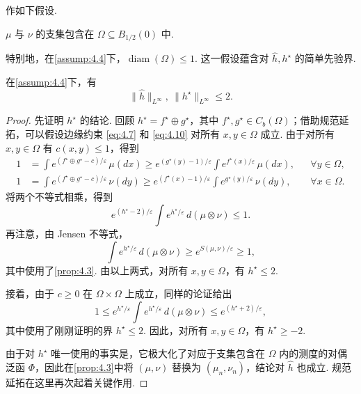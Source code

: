 作如下假设.
\begin{assumption}\label{assump:4.4}
$\mu$ 与 $\nu$ 的支集包含在 $\Omega\subseteq B_{1/2}(0)$ 中.
\end{assumption}
特别地，在\autoref{assump:4.4}下，$\operatorname{diam}(\Omega)\le1$. 这一假设蕴含对 $\widehat h,h^\star$ 的简单先验界.
\begin{proposition}\label{prop:4.5}
在\autoref{assump:4.4}下，有
$$\|\widehat h\|_{L^\infty},\ \|h^\star\|_{L^\infty}\le2.$$
\end{proposition}
\begin{proof}
先证明 $h^\star$ 的结论. 回顾 $h^\star=f^\star\oplus g^\star$，其中 $f^\star,g^\star\in C_b(\Omega)$；借助规范延拓，可以假设边缘约束 \eqref{eq:4.7} 和 \eqref{eq:4.10} 对所有 $x,y\in\Omega$ 成立. 由于对所有 $x,y\in\Omega$ 有 $c(x,y)\le1$，得到
$$\begin{aligned}
1&=\int e^{(f^\star\oplus g^\star-c)/\varepsilon}\,\mu(dx)
\ge e^{(g^\star(y)-1)/\varepsilon}\int e^{f^\star(x)/\varepsilon}\,\mu(dx),&&\forall y\in\Omega,\\
1&=\int e^{(f^\star\oplus g^\star-c)/\varepsilon}\,\nu(dy)
\ge e^{(f^\star(x)-1)/\varepsilon}\int e^{g^\star(y)/\varepsilon}\,\nu(dy),&&\forall x\in\Omega.
\end{aligned}$$
将两个不等式相乘，得到
$$e^{(h^\star-2)/\varepsilon}\int e^{h^\star/\varepsilon}\,d(\mu\otimes\nu)\le1.$$
再注意，由 Jensen 不等式，
$$\int e^{h^\star/\varepsilon}\,d(\mu\otimes\nu)\ge e^{S(\mu,\nu)/\varepsilon}\ge1,$$
其中使用了\autoref{prop:4.3}. 由以上两式，对所有 $x,y\in\Omega$，有 $h^\star\le2$.

接着，由于 $c\ge0$ 在 $\Omega\times\Omega$ 上成立，同样的论证给出
$$1\le e^{h^\star/\varepsilon}\int e^{h^\star/\varepsilon}\,d(\mu\otimes\nu)
\le e^{(h^\star+2)/\varepsilon},$$
其中使用了刚刚证明的界 $h^\star\le2$. 因此，对所有 $x,y\in\Omega$，有 $h^\star\ge-2$.

由于对 $h^\star$ 唯一使用的事实是，它极大化了对应于支集包含在 $\Omega$ 内的测度的对偶泛函 $\Phi$，因此在\autoref{prop:4.3}中将 $(\mu,\nu)$ 替换为 $(\mu_n,\nu_n)$，结论对 $\widehat h$ 也成立. 规范延拓在这里再次起着关键作用.
\end{proof}

